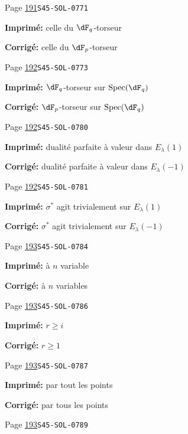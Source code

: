 \documentclass[oneside]{book}
\DeclareMathOperator{\spec}{Spec}
\theoremstyle{sga-source}
\theoremstyle{sga-source-dash}
\theoremstyle{sga-source-dotdash}
\theoremstyle{sga-source-number-note-dash}
\theoremstyle{sga-source-note-number-dotdash}
\theoremstyle{sga-source-example-dotdash}
\theoremstyle{sga-source-inline-number}
\theoremstyle{sga-source-bare-number}
\theoremstyle{sga-source}
\begin{document}
\begin{description}
\smallskip
\item[\hypertarget{apparatus:FR-0163}{163}] Page \hyperlink{printpage:fr:191}{191}\quad\texttt{S45-SOL-0771}
\par\noindent\textbf{Imprimé:} celle du $\dF_q$-torseur
\par\noindent\textbf{Corrigé:} celle du $\dF_p$-torseur
\smallskip
\item[\hypertarget{apparatus:FR-0164}{164}] Page \hyperlink{printpage:fr:192}{192}\quad\texttt{S45-SOL-0773}
\par\noindent\textbf{Imprimé:} $\dF_q$-torseur sur $\spec(\dF_q)$
\par\noindent\textbf{Corrigé:} $\dF_p$-torseur sur $\spec(\dF_q)$
\smallskip
\item[\hypertarget{apparatus:FR-0165}{165}] Page \hyperlink{printpage:fr:192}{192}\quad\texttt{S45-SOL-0780}
\par\noindent\textbf{Imprimé:} dualité parfaite à valeur dans $E_\lambda(1)$
\par\noindent\textbf{Corrigé:} dualité parfaite à valeur dans $E_\lambda(-1)$
\smallskip
\item[\hypertarget{apparatus:FR-0166}{166}] Page \hyperlink{printpage:fr:192}{192}\quad\texttt{S45-SOL-0781}
\par\noindent\textbf{Imprimé:} $\sigma^\ast$ agit trivialement sur $E_\lambda(1)$
\par\noindent\textbf{Corrigé:} $\sigma^\ast$ agit trivialement sur $E_\lambda(-1)$
\smallskip
\item[\hypertarget{apparatus:FR-0167}{167}] Page \hyperlink{printpage:fr:193}{193}\quad\texttt{S45-SOL-0784}
\par\noindent\textbf{Imprimé:} à $n$ variable
\par\noindent\textbf{Corrigé:} à $n$ variables
\smallskip
\item[\hypertarget{apparatus:FR-0168}{168}] Page \hyperlink{printpage:fr:193}{193}\quad\texttt{S45-SOL-0786}
\par\noindent\textbf{Imprimé:} $r\geqslant i$
\par\noindent\textbf{Corrigé:} $r\geqslant 1$
\smallskip
\item[\hypertarget{apparatus:FR-0169}{169}] Page \hyperlink{printpage:fr:193}{193}\quad\texttt{S45-SOL-0787}
\par\noindent\textbf{Imprimé:} par tout les points
\par\noindent\textbf{Corrigé:} par tous les points
\smallskip
\item[\hypertarget{apparatus:FR-0170}{170}] Page \hyperlink{printpage:fr:193}{193}\quad\texttt{S45-SOL-0789}

\end{description}
\end{document}
